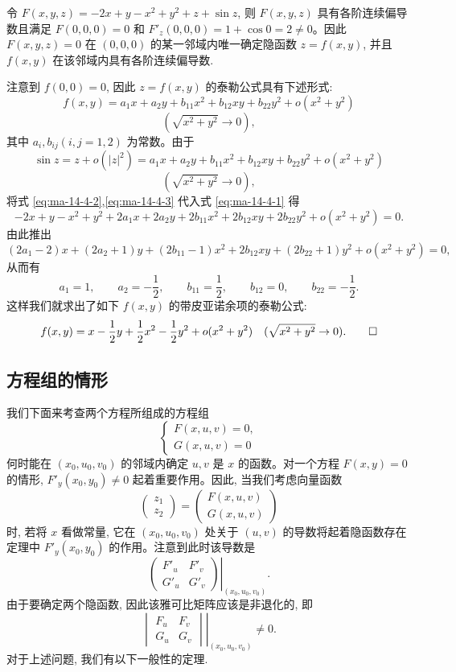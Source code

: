 \begin{solve}
令 $F(x,y,z)=-2x+y-x^2+y^2+z+\sin z$, 则 $F(x,y,z)$ 具有各阶连续偏导数且满足 $F(0,0,0)=0$ 和 $F'_z(0,0,0)=1+\cos0=2\ne0$。因此 $F(x,y,z)=0$ 在 $(0,0,0)$ 的某一邻域内唯一确定隐函数 $z=f(x,y)$, 并且 $f(x,y)$ 在该邻域内具有各阶连续偏导数.

注意到 $f(0,0)=0$, 因此 $z=f(x,y)$ 的泰勒公式具有下述形式:
\begin{equation}
  f(x,y)=a_1x+a_2y+b_{11}x^2+b_{12}xy+b_{22}y^2+o(x^2+y^2)
  \label{eq:ma-14-4-2}
\end{equation}
\[
  (\sqrt{x^2+y^2}\to0),
\]
其中 $a_i,b_{ij}(i,j=1,2)$ 为常数。由于
\begin{equation}
  \sin z=z+o(|z|^2)
  =a_1x+a_2y+b_{11}x^2+b_{12}xy+b_{22}y^2+o(x^2+y^2)
  \label{eq:ma-14-4-3}
\end{equation}
\[
  (\sqrt{x^2+y^2}\to0),
\]
将式 \eqref{eq:ma-14-4-2},\eqref{eq:ma-14-4-3} 代入式 \eqref{eq:ma-14-4-1} 得
\[
  -2x+y-x^2+y^2+2a_1x+2a_2y+2b_{11}x^2+2b_{12}xy+2b_{22}y^2+o(x^2+y^2)=0.
\]
由此推出
\[
  (2a_1-2)x+(2a_2+1)y+(2b_{11}-1)x^2
  +2b_{12}xy+(2b_{22}+1)y^2+o(x^2+y^2)=0,
\]
从而有
\[
  a_1=1,\qquad a_2=-\frac12,\qquad b_{11}=\frac12,\qquad
  b_{12}=0,\qquad b_{22}=-\frac12.
\]
这样我们就求出了如下 $f(x,y)$ 的带皮亚诺余项的泰勒公式:
\[
  f(x,y)=x-\frac12y+\frac12x^2-\frac12y^2+o(x^2+y^2)
  \quad(\sqrt{x^2+y^2}\to0).
\qedhere
\]
\end{solve}


\subsection{方程组的情形}
\label{subsec:ma-14-4-2}

我们下面来考查两个方程所组成的方程组
\[
  \begin{cases}
    F(x,u,v)=0,\\
    G(x,u,v)=0
  \end{cases}
\]
何时能在 $(x_0,u_0,v_0)$ 的邻域内确定 $u,v$ 是 $x$ 的函数。对一个方程 $F(x,y)=0$ 的情形, $F'_y(x_0,y_0)\ne0$ 起着重要作用。因此, 当我们考虑向量函数
\[
  \begin{pmatrix}
    z_1\\
    z_2
  \end{pmatrix}
  =
  \begin{pmatrix}
    F(x,u,v)\\
    G(x,u,v)
  \end{pmatrix}
\]
时, 若将 $x$ 看做常量, 它在 $(x_0,u_0,v_0)$ 处关于 $(u,v)$ 的导数将起着隐函数存在定理中 $F'_y(x_0,y_0)$ 的作用。注意到此时该导数是
\[
  \left.
  \begin{pmatrix}
    F'_u & F'_v\\
    G'_u & G'_v
  \end{pmatrix}
  \right|_{(x_0,u_0,v_0)}.
\]
由于要确定两个隐函数, 因此该雅可比矩阵应该是非退化的, 即
\[
  \left.
  \begin{vmatrix}
    F_u & F_v\\
    G_u & G_v
  \end{vmatrix}
  \right|_{(x_0,u_0,v_0)}\ne0.
\]
对于上述问题, 我们有以下一般性的定理.

